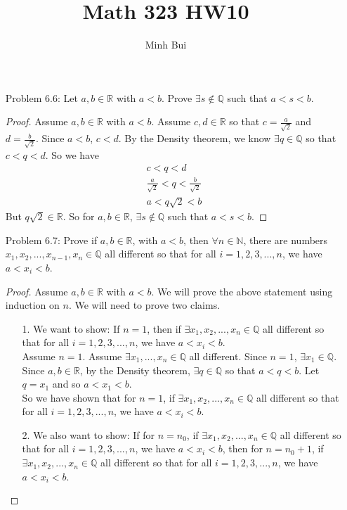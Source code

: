 \documentclass{article}
\author{Minh Bui}
\title{Math 323 HW10}
\theoremstyle{claim}
\theoremstyle{definition}
\begin{document}
\maketitle
\begin{enumerate} 
    \item[Problem 6.6:] Let $a, b \in \mathbb{R}$ with $a < b$. Prove $\exists s \notin \mathbb{Q}$ such that $a < s < b$.
        \begin{proof}
            Assume $a, b \in \mathbb{R}$ with $a < b$. Assume $c, d \in \mathbb{R}$ so that $c = \frac{a}{\sqrt{2}}$ and $d = \frac{b}{\sqrt{2}}$. Since $a < b$, $c < d$. By the Density theorem, we know $\exists q \in \mathbb{Q}$ so that $c < q < d$. So we have
            \begin{gather*}
                c < q < d\\
                \frac{a}{\sqrt{2}} < q < \frac{b}{\sqrt{2}}\\
                a < q\sqrt{2} < b
            \end{gather*}
            But $q\sqrt{2} \in \mathbb{R}$. So for $a, b \in \mathbb{R}$, $\exists s \notin \mathbb{Q}$ such that $a < s < b$.
        \end{proof}
    \item[Problem 6.7:] Prove if $a, b \in \mathbb{R}$, with $a < b$, then $\forall n \in \mathbb{N}$, there are numbers $x_1, x_2, ..., x_{n-1}, x_n \in \mathbb{Q}$ all different so that for all $i = 1, 2, 3, ..., n$, we have $a < x_i < b$.
        \begin{proof}
            Assume $a, b \in \mathbb{R}$ with $a < b$. We will prove the above statement using induction on $n$. We will need to prove two claims.
            \begin{enumerate}
                \item[1.] We want to show: If $n = 1$, then if $\exists x_1, x_2, ..., x_n \in \mathbb{Q}$ all different so that for all $i = 1, 2, 3, ..., n$, we have $a < x_i < b$.\\
                    Assume $n = 1$. Assume $\exists x_1, ..., x_n \in \mathbb{Q}$ all different. Since $n = 1$, $\exists x_1 \in \mathbb{Q}$. Since $a, b \in \mathbb{R}$, by the Density theorem, $\exists q \in \mathbb{Q}$ so that $a < q < b$. Let $q = x_1$ and so $a < x_1 < b$.\\
                    So we have shown that for $n = 1$, if $\exists x_1, x_2, ..., x_n \in \mathbb{Q}$ all different so that for all $i = 1, 2, 3, ..., n$, we have $a < x_i < b$.
                \item[2.] We also want to show: If for $n = n_0$, if $\exists x_1, x_2, ..., x_n \in \mathbb{Q}$ all different so that for all $i = 1, 2, 3, ..., n$, we have $a < x_i < b$, then for $n = n_0 + 1$, if $\exists x_1, x_2, ..., x_n \in \mathbb{Q}$ all different so that for all $i = 1, 2, 3, ..., n$, we have $a < x_i < b$.\\

\end{enumerate}
\end{proof}
\end{enumerate}
\end{document}
